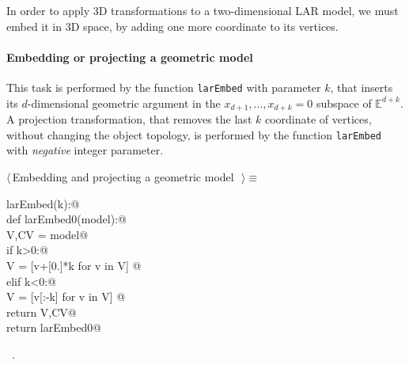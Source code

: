 \documentclass[11pt,oneside]{article}	%
\def\E{\mathbb{E}}
\begin{document}
In order to apply 3D transformations to a two-dimensional LAR model, we must embed it in 3D space, by adding one more coordinate to its vertices. 

\paragraph{Embedding or projecting a geometric model}

This task is performed by the function \texttt{larEmbed} with parameter $k$, that inserts its $d$-dimensional geometric argument in the $x_{d+1}, \ldots, x_{d+k}=0$ subspace of $\E^{d+k}$.
A projection transformation, that removes the last $k$ coordinate of vertices, without changing the object topology, is performed by the function \texttt{larEmbed} with \emph{negative} integer parameter.


\begin{flushleft} \small \label{scrap5}
$\langle\,$Embedding and projecting a geometric model\nobreak\ {\footnotesize {}}$\,\rangle\equiv$
\vspace{-1ex}
\begin{list}{}{} \item
\mbox{}\verb@def larEmbed(k):@\\
\mbox{}\verb@   def larEmbed0(model):@\\
\mbox{}\verb@      V,CV = model@\\
\mbox{}\verb@      if k>0:@\\
\mbox{}\verb@         V = [v+[0.]*k for v in V] @\\
\mbox{}\verb@      elif k<0:@\\
\mbox{}\verb@         V = [v[:-k] for v in V] @\\
\mbox{}\verb@      return V,CV@\\
\mbox{}\verb@   return larEmbed0@\\
\mbox{}\verb@@{\NWsep}
\end{list}
\vspace{-1ex}
\footnotesize\addtolength{\baselineskip}{-1ex}
\begin{list}{}{\setlength{\itemsep}{-\parsep}\setlength{\itemindent}{-\leftmargin}}
\item \NWtxtMacroRefIn\ .
\end{list}
\end{flushleft}
\end{document}
